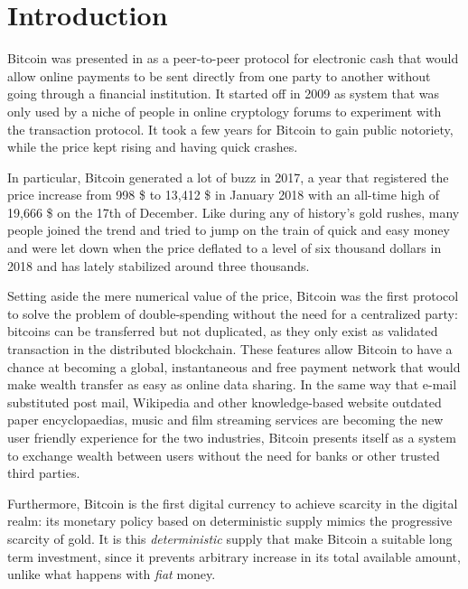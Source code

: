 \chapter{Introduction}
\label{chpr:intro}

\bigskip


Bitcoin was presented in \citep{BTC2008} as a peer-to-peer protocol for electronic cash that would allow online payments to be sent directly from one party to another without going through a financial institution.
It started off in 2009 as system that was only used by a niche of people in online cryptology forums  to experiment with the transaction protocol. It took a few years for Bitcoin to gain public notoriety, while the price kept rising and having quick crashes. 

In particular, Bitcoin generated a lot of buzz in 2017, a year that registered the price increase from 998 \$ to 13,412 \$ in January 2018 with an all-time high of 19,666 \$ on the 17th of December. 
Like during any of history's gold rushes, many people joined the trend and tried to jump on the train  of quick and easy money and were let down when the price deflated to a level of six thousand dollars in 2018 and has lately stabilized around three thousands.

Setting aside the mere numerical value of the price, Bitcoin was the first protocol to solve the problem of double-spending without the need for a centralized party: bitcoins can be transferred but not duplicated, as they only exist as validated transaction in the distributed blockchain. 
These features allow Bitcoin to have a chance at becoming a global, instantaneous and free payment network that would make wealth transfer as easy as online data sharing.
In the same way that e-mail substituted post mail, Wikipedia and other knowledge-based website outdated paper encyclopaedias, music and film streaming services are becoming the new user friendly experience for the two industries, Bitcoin presents itself as a system to exchange wealth between users without the need for banks or other trusted third parties.

Furthermore, Bitcoin is the first digital currency to achieve scarcity in the digital realm: its monetary policy based on deterministic supply mimics the progressive scarcity of gold. It is this \textit{deterministic} supply that make Bitcoin a suitable long term investment, since it prevents arbitrary increase in its total available amount, unlike what happens with \textit{fiat} money.

